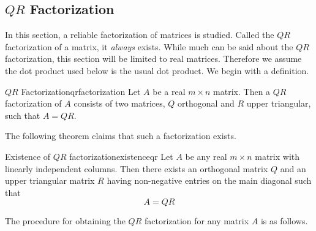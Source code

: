 \subsection{$QR$ Factorization}

In this section, a reliable factorization of matrices is studied. Called the $QR$ factorization of a matrix, it \textit{always} exists. While much can be said about the $QR$ factorization, this section will be limited to real matrices. Therefore we assume the dot product used below is the usual dot product. We begin with a definition. 

\begin{definition}{$QR$ Factorization}{qrfactorization}
Let $A$ be a real $m\times n$ matrix. Then a $QR$ factorization of $A$ consists
of two matrices, $Q$ orthogonal and $R$ upper
triangular, such that $A=QR.$ 
\end{definition}

The following theorem claims that such a factorization exists. 

\begin{theorem}{Existence of $QR$ factorization}{existenceqr}
Let $A$ be any real $m\times n$ matrix with linearly independent columns. Then there exists an orthogonal
matrix $Q$ and an upper triangular matrix $R$ having non-negative entries
on the main diagonal such that
\begin{equation*}
A=QR
\end{equation*}
\end{theorem}

The procedure for obtaining the $QR$ factorization for any matrix $A$ is as follows.

